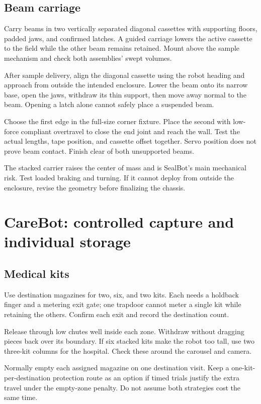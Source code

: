 \documentclass[10pt,a4paper]{article}
\begin{document}
\subsection{Beam carriage}
Carry beams in two vertically separated diagonal cassettes with supporting floors, padded jaws, and confirmed latches. A guided carriage lowers the active cassette to the field while the other beam remains retained. Mount above the sample mechanism and check both assemblies' swept volumes.

After sample delivery, align the diagonal cassette using the robot heading and approach from outside the intended enclosure. Lower the beam onto its narrow base, open the jaws, withdraw its thin support, then move away normal to the beam. Opening a latch alone cannot safely place a suspended beam.

Choose the first edge in the full-size corner fixture. Place the second with low-force compliant overtravel to close the end joint and reach the wall. Test the actual lengths, tape position, and cassette offset together. Servo position does not prove beam contact. Finish clear of both unsupported beams.

The stacked carrier raises the center of mass and is SealBot's main mechanical risk. Test loaded braking and turning. If it cannot deploy from outside the enclosure, revise the geometry before finalizing the chassis.

\section{CareBot: controlled capture and individual storage}
\subsection{Medical kits}
Use destination magazines for two, six, and two kits. Each needs a holdback finger and a metering exit gate; one trapdoor cannot meter a single kit while retaining the others. Confirm each exit and record the destination count.

Release through low chutes well inside each zone. Withdraw without dragging pieces back over its boundary. If six stacked kits make the robot too tall, use two three-kit columns for the hospital. Check these around the carousel and camera.

Normally empty each assigned magazine on one destination visit. Keep a one-kit-per-destination protection route as an option if timed trials justify the extra travel under the empty-zone penalty. Do not assume both strategies cost the same time.
\end{document}
